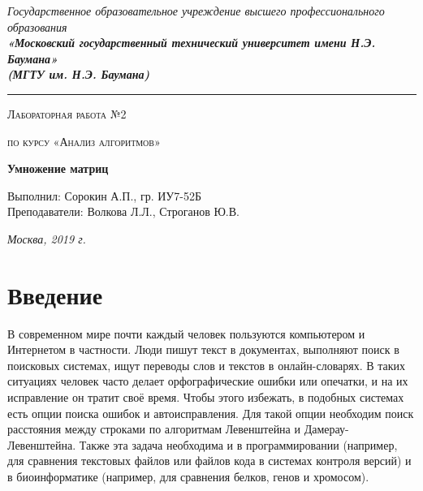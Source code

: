 \documentclass[12pt, a4paper]{report}
\begin{document}
    \begin{titlepage}

        \begin{center}
            \Large
            {\sl Государственное образовательное учреждение высшего профессионального образования\\
            {\bf«Московский государственный технический университет имени Н.Э. Баумана»\\
				(МГТУ им. Н.Э. Баумана)}}
				\noindent\rule{\textwidth}{2pt}
            \vspace{3cm}

			{\scshape\LARGE Лабораторная работа №2 \par}
			\vspace{0.5cm}	
			{\scshape\LARGE по курсу «Анализ алгоритмов» \par}
			\vspace{1.5cm}
			{\huge\bfseries Умножение матриц \par}
			\vspace{2cm}
			\Large Выполнил: Сорокин А.П., гр. ИУ7-52Б\\
			\vspace{0.5cm}
			{\Large Преподаватели: Волкова Л.Л., Строганов Ю.В.}
		
			\vfill
			\Large \textit {Москва, 2019 г.}
            
        \end{center}

    \end{titlepage}
	
	\tableofcontents

	\chapter*{Введение}
	
	В современном мире почти каждый человек пользуются компьютером и Интернетом в частности. Люди пишут текст в документах, выполняют поиск в поисковых системах, ищут переводы слов и текстов в онлайн-словарях. В таких ситуациях человек часто делает орфографические ошибки или опечатки, и на их исправление он тратит своё время. Чтобы этого избежать, в подобных системах есть опции поиска ошибок и автоисправления. Для такой опции необходим поиск расстояния между строками по алгоритмам Левенштейна и Дамерау-Левенштейна. Также эта задача необходима и в программировании (например, для сравнения текстовых файлов или файлов кода в системах контроля версий) и в биоинформатике (например, для сравнения белков, генов и хромосом).
\end{document}
